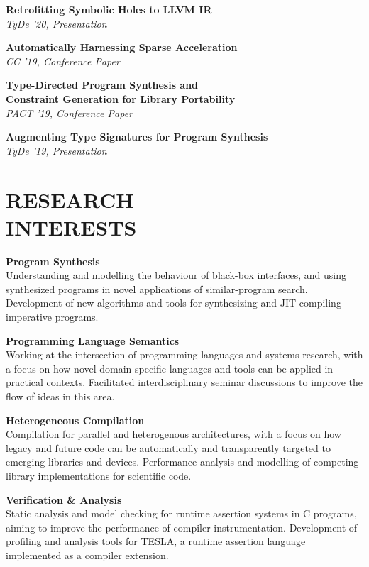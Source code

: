 \documentclass[margin]{res}
\begin{document}
\begin{resume}
\par
\textbf{Retrofitting Symbolic Holes to LLVM IR}\\
\emph{TyDe '20, Presentation}

\par
\textbf{Automatically Harnessing Sparse Acceleration}\\
\emph{CC '19, Conference Paper}

\par
\textbf{Type-Directed Program Synthesis and\\Constraint Generation for Library Portability}\\
\emph{PACT '19, Conference Paper}

\par
\textbf{Augmenting Type Signatures for Program Synthesis}\\
\emph{TyDe '19, Presentation}

\section{RESEARCH\\INTERESTS}

\par
\textbf{Program Synthesis}\\
Understanding and modelling the behaviour of black-box interfaces, and using
synthesized programs in novel applications of similar-program search.
Development of new algorithms and tools for synthesizing and JIT-compiling
imperative programs.

\par
\textbf{Programming Language Semantics}\\
Working at the intersection of programming languages and systems research, with
a focus on how novel domain-specific languages and tools can be applied in
practical contexts. Facilitated interdisciplinary seminar discussions to improve
the flow of ideas in this area.

\par
\textbf{Heterogeneous Compilation}\\
Compilation for parallel and heterogenous architectures, with a focus on how
legacy and future code can be automatically and transparently targeted to
emerging libraries and devices. Performance analysis and modelling of
competing library implementations for scientific code.

\par
\textbf{Verification \& Analysis}\\
Static analysis and model checking for runtime assertion systems in C programs,
aiming to improve the performance of compiler instrumentation. Development of
profiling and analysis tools for TESLA, a runtime assertion language implemented
as a compiler extension.


\end{resume}
\end{document}
